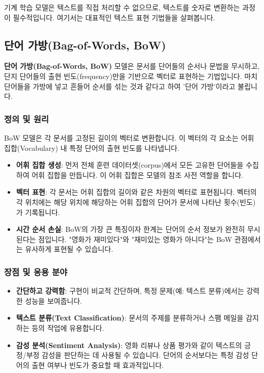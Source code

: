\documentclass[11pt,a4paper]{article}
\begin{document}
기계 학습 모델은 텍스트를 직접 처리할 수 없으므로, 텍스트를 숫자로 변환하는 과정이 필수적입니다. 여기서는 대표적인 텍스트 표현 기법들을 살펴봅니다.

\subsection{단어 가방(Bag-of-Words, BoW)}

\begin{conceptbox}
\textbf{단어 가방(Bag-of-Words, BoW)} 모델은 문서를 단어들의 순서나 문법을 무시하고, 단지 단어들의 출현 빈도(frequency)만을 기반으로 벡터로 표현하는 기법입니다. 마치 단어들을 가방에 넣고 흔들어 순서를 섞는 것과 같다고 하여 '단어 가방'이라고 불립니다.
\end{conceptbox}

\subsubsection{정의 및 원리}
BoW 모델은 각 문서를 고정된 길이의 벡터로 변환합니다. 이 벡터의 각 요소는 어휘 집합(Vocabulary) 내 특정 단어의 출현 빈도를 나타냅니다.

\begin{itemize}
    \item \textbf{어휘 집합 생성}: 먼저 전체 훈련 데이터셋(corpus)에서 모든 고유한 단어들을 수집하여 어휘 집합을 만듭니다. 이 어휘 집합은 모델의 참조 사전 역할을 합니다.
    \item \textbf{벡터 표현}: 각 문서는 어휘 집합의 길이와 같은 차원의 벡터로 표현됩니다. 벡터의 각 위치에는 해당 위치에 해당하는 어휘 집합의 단어가 문서에 나타난 횟수(빈도)가 기록됩니다.
    \item \textbf{시간 순서 손실}: BoW의 가장 큰 특징이자 한계는 단어의 순서 정보가 완전히 무시된다는 점입니다. "영화가 재미있다"와 "재미있는 영화가 아니다"는 BoW 관점에서는 유사하게 표현될 수 있습니다.
\end{itemize}

\subsubsection{장점 및 응용 분야}
\begin{itemize}
    \item \textbf{간단하고 강력함}: 구현이 비교적 간단하며, 특정 문제(예: 텍스트 분류)에서는 강력한 성능을 보여줍니다.
    \item \textbf{텍스트 분류(Text Classification)}: 문서의 주제를 분류하거나 스팸 메일을 감지하는 등의 작업에 유용합니다.
    \item \textbf{감성 분석(Sentiment Analysis)}: 영화 리뷰나 상품 평가와 같이 텍스트의 긍정/부정 감성을 판단하는 데 사용될 수 있습니다. 단어의 순서보다는 특정 감성 단어의 출현 여부나 빈도가 중요할 때 효과적입니다.
\end{itemize}
\end{document}
